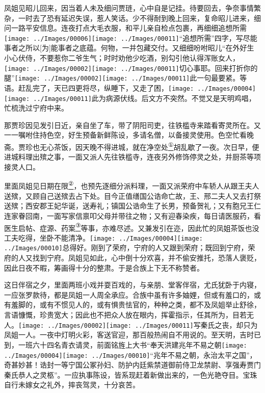凤姐见昭儿回来，因当着人未及细问贾琏，心中自是记挂。待要回去，争奈事情繁杂，一时去了恐有延迟失误，惹人笑话。少不得耐到晚上回来，复命昭儿进来，细问一路平安信息。连夜打点大毛衣服，和平儿亲自检点包裹，再细细追想所需{\texttt{[image: ../Images/00006]}\texttt{[image: ../Images/00011]}\footnotesize \kaishu ``追想所需''四字，写尽能事者之所以{[}为{]}能事者之底蕴。}何物，一并包藏交付。又细细吩咐昭儿``在外好生小心伏侍，不要惹你二爷生气；时时劝他少吃酒，别勾引他认得浑账女人，{\texttt{[image: ../Images/00002]}\texttt{[image: ../Images/00011]}\footnotesize \kaishu 切心事耶。}回来打折你的腿''{\texttt{[image: ../Images/00002]}\texttt{[image: ../Images/00011]}\footnotesize \kaishu 此一句最要紧。}等语。赶乱完了，天已四更将尽，纵睡下，又走了困，{\texttt{[image: ../Images/00004]}\texttt{[image: ../Images/00011]}\footnotesize \kaishu 此为病源伏线。后文方不突然。}不觉又是天明鸡唱，忙梳洗过宁府中来。

那贾珍因见发引日近，亲自坐了车，带了阴阳司吏，往铁槛寺来踏看寄灵所在。又一一嘱咐住持色空，好生预备新鲜陈设，多请名僧，以备接灵使用。色空忙看晚斋。贾珍也无心茶饭，因天晚不得进城，就在净空处\href{../Text/part0018_split_000.html\#lnkback_1_a}{\textsuperscript{①}}胡乱歇了一夜。次日早，便进城料理出殡之事，一面又派人先往铁槛寺，连夜另外修饰停灵之处，并厨茶等项接灵人口。

里面凤姐见日期在限\href{../Text/part0018_split_000.html\#lnkback_2_a}{\textsuperscript{②}}，也预先逐细分派料理，一面又派荣府中车轿人从跟王夫人送殡，又顾自己送殡去占下处。目今正值缮国公诰命亡故，王、邢二夫人又去打祭送殡；西安郡王妃华诞，送寿礼；镇国公诰命生了长男，预备贺礼；又有胞兄王仁连家眷回南，一面写家信禀叩父母并带往之物；又有迎春染疾，每日请医服药，看医生启帖、症源、药案\href{../Text/part0018_split_000.html\#lnkback_3_a}{\textsuperscript{③}}等事，亦难尽述。又兼发引在迩，因此忙的凤姐茶饭也没工夫吃得，坐卧不能清净。{\texttt{[image: ../Images/00004]}\texttt{[image: ../Images/00010]}\footnotesize \kaishu 总得好。}刚到了荣府，宁府的人又跟到荣府；既回到宁府，荣府的人又找到宁府。凤姐见如此，心中倒十分欢喜，并不偷安推托，恐落人褒贬，因此日夜不暇，筹画得十分的整肃。于是合族上下无不称赞者。

这日伴宿之夕，里面两班小戏并耍百戏的，与亲朋、堂客伴宿，尤氏犹卧于内寝，一应张罗款待，都是凤姐一人周全承应。合族中虽有许多妯娌，但或有羞口的，或有羞脚的，或有不惯见人的，或有惧贵怯官的，种种之类，都不及凤姐举止舒徐，言语慷慨，珍贵宽大；因此也不把众人放在眼内，挥霍指示，任其所为，目若无人。{\texttt{[image: ../Images/00002]}\texttt{[image: ../Images/00011]}\footnotesize \kaishu 写秦氏之丧，却只为凤姐一人。}一夜中灯明火彩，客送官迎，那百般热闹自不用说的。至天明，吉时已到，一班六十四名青衣请灵，前面铭旌上大书``奉天洪建兆年不易之朝{\texttt{[image: ../Images/00004]}\texttt{[image: ../Images/00010]}\footnotesize \kaishu ``兆年不易之朝，永治太平之国''，奇甚妙甚！}诰封一等宁国公冢孙妇、防护内廷紫禁道御前侍卫龙禁尉、享强寿贾门秦氏恭人之灵柩''。一应执事陈设，皆系现赶着新做出来的，一色光艳夺目。宝珠自行未嫁女之礼外，摔丧驾灵，十分哀苦。

